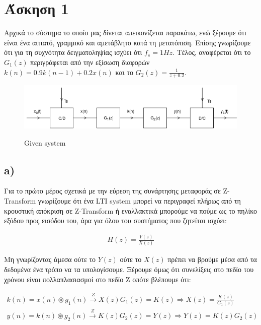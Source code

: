 \documentclass[11pt]{article}
\begin{document}
\section*{Άσκηση 1}
Αρχικά το σύστημα το οποίο μας δίνεται απεικονίζεται παρακάτω, ενώ ξέρουμε ότι είναι ένα αιτιατό, γραμμικό και αμετάβλητο κατά τη μετατόπιση. Επίσης γνωρίζουμε ότι για τη συχνότητα δειγματοληψίας ισχύει ότι $f_s=1Hz$. Τέλος, αναφέρεται ότι το $G_1(z)$ περιγράφεται από την εξίσωση διαφορών $k(n) = 0.9k(n-1)+0.2x(n)$ και το $G_2(z)=\frac{1}{z+0.2}$.

\begin{figure}[h]
    \centering
    \includegraphics[scale=0.6]{photos/system-diagram.png} \\
    \caption{Given system}
\end{figure}



\subsection*{a)}
Για το πρώτο μέρος σχετικά με την εύρεση της συνάρτησης μεταφοράς σε Z-Transform γνωρίζουμε ότι ένα LTI system μπορεί να περιγραφεί πλήρως από τη κρουστική απόκριση σε Z-Transform  ή εναλλακτικά μπορούμε να πούμε ως το πηλίκο εξόδου προς εισόδου του, άρα για όλου του συστήματος που ζητείται ισχύει:

\begin{align}
    \boxed{H(z)=\frac{Y(z)}{X(z)}} \label{tranf_func}
\end{align}

\par \noindent
Μη γνωρίζοντας άμεσα ούτε το $Y(z)$ ούτε το $X(z)$ πρέπει να βρούμε μέσα από τα δεδομένα ένα τρόπο να τα υπολογίσουμε. Ξέρουμε όμως ότι συνελίξεις στο πεδίο του χρόνου είναι πολλαπλασιασμοί στο πεδίο Ζ οπότε βλέπουμε ότι:

\begin{align}
    k(n) = x(n) \circledast g_1(n) \xrightarrow[]{Z} X(z)G_1(z)=K(z) \Rightarrow \boxed{X(z) = \frac{K(z)}{G_1(z)}} \label{first_conv} \\
    y(n) = k(n) \circledast g_2(n) \xrightarrow[]{Z} K(z)G_2(z)=Y(z) \Rightarrow \boxed{Y(z) = K(z)G_2(z)} \label{second_conv}
\end{align}
\end{document}
